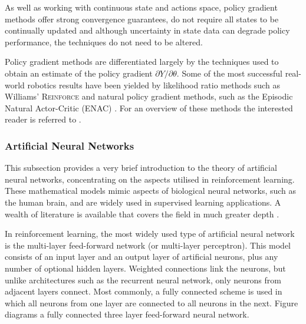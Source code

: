 As well as working with continuous state and actions space, policy gradient
methods offer strong convergence guarantees, do not require all states to be
continually updated and although uncertainty in state data can degrade policy
performance, the techniques do not need to be altered.

Policy gradient methods are differentiated largely by the techniques used to
obtain an estimate of the policy gradient $\partial Y / \partial \theta$. Some
of the most successful real-world robotics results have been yielded by
likelihood ratio methods \cite{glynn87,aleksandrov68} such as Williams'
\textsc{Reinforce} \cite{williams:reinforce} and natural policy gradient
methods, such as the Episodic Natural Actor-Critic (ENAC) \cite{peters:enac}.
For an overview of these methods the interested reader is referred to
.

\subsubsection{Artificial Neural Networks}
This subsection provides a very brief introduction to the theory of artificial
neural networks, concentrating on the aspects utilised in reinforcement
learning.  These mathematical models mimic aspects of biological neural
networks, such as the human brain, and are widely used in supervised learning
applications.  A wealth of literature is available that covers the field
in much greater depth \cite{bishop96ann,fausett94}.

In reinforcement learning, the most widely used type of artificial neural
network is the multi-layer feed-forward network (or multi-layer perceptron).
This model consists of an input layer and an output layer of artificial neurons,
plus any number of optional hidden layers.  Weighted connections link the
neurons, but unlike architectures such as the recurrent neural network, only
neurons from adjacent layers connect.  Most commonly, a fully connected scheme
is used in which all neurons from one layer are connected to all neurons in the
next.  Figure \label{fig:perceptron} diagrams a fully connected three layer
feed-forward neural network.


